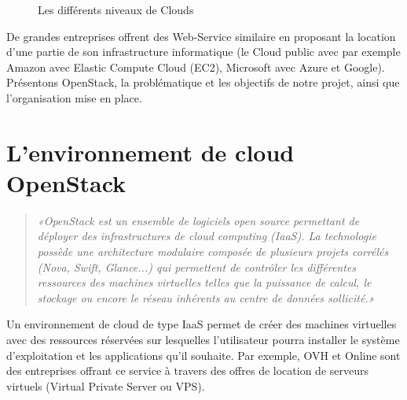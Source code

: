\documentclass{report}
\begin{document}
    \begin{figure}[H]
        \caption{Les différents niveaux de Clouds \cite{wiki_IaaS}}
    \end{figure}

    De grandes entreprises offrent des Web-Service similaire en proposant la location d'une partie de son infrastructure informatique (le Cloud public avec par exemple Amazon avec Elastic Compute Cloud (EC2), Microsoft avec Azure et Google).\newline
    Présentons OpenStack, la problématique et les objectifs de notre projet, ainsi que l'organisation mise en place.

    \section{L'environnement de cloud OpenStack}

        \begin{quote}
            \textit{«OpenStack est un ensemble de logiciels open source permettant de déployer des infrastructures de cloud computing (IaaS). La technologie possède une architecture modulaire composée de plusieurs projets corrélés (Nova, Swift, Glance...) qui permettent de contrôler les différentes ressources des machines virtuelles telles que la puissance de calcul, le stockage ou encore le réseau inhérents au centre de données sollicité.»
            \cite{wiki_openstack}}
        \end{quote}

        \bigbreak

        Un environnement de cloud de type IaaS permet de créer des machines virtuelles avec des ressources réservées sur lesquelles l'utilisateur pourra installer le système d'exploitation et les applications qu'il souhaite. Par exemple, OVH et Online sont des entreprises offrant ce service à travers des offres de location de serveurs virtuels (Virtual Private Server ou VPS).
\end{document}
